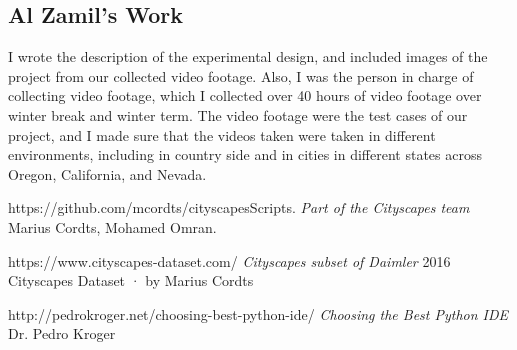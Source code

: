 \documentclass[10pt,draftclsnofoot,onecolumn,journal,compsoc]{IEEEtran}
\begin{document}
\subsection{Al Zamil's Work}
I wrote the description of the experimental design, and included images of the project from our collected video footage. 
Also, I was the person in charge of collecting video footage, which I collected over 40 hours of video footage over winter break and winter term.
The video footage were the test cases of our project, and I made sure that the videos taken were taken in different environments, including in country side and in cities in different states across Oregon, California, and Nevada.

\newpage



\begin{thebibliography}{12}

 https://github.com/mcordts/cityscapesScripts.
\textit{Part of the Cityscapes team} Marius Cordts, Mohamed Omran.

 https://www.cityscapes-dataset.com/
\textit{Cityscapes subset of Daimler} 2016 Cityscapes Dataset · by Marius Cordts 

 http://pedrokroger.net/choosing-best-python-ide/
\textit{Choosing the Best Python IDE} Dr. Pedro Kroger

\end{thebibliography}
        
\end{document}
